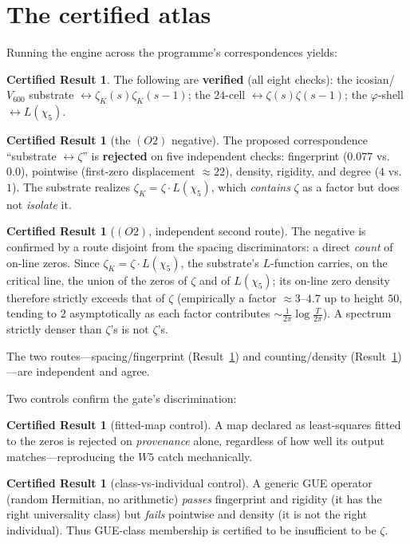 \documentclass[11pt]{article}
\theoremstyle{definition}
\newtheorem{result}[theorem]{Certified Result}
\newcommand{\zetaK}{\zeta_{K}}
\begin{document}
\section{The certified atlas}
Running the engine across the programme's correspondences yields:
\begin{result}\label{res:pos}
The following are \textbf{verified} (all eight checks): the icosian/$V_{600}$
substrate $\leftrightarrow \zetaK(s)\zetaK(s-1)$; the $24$-cell
$\leftrightarrow \zeta(s)\zeta(s-1)$; the $\varphi$-shell $\leftrightarrow L(\chi_5)$.
\end{result}
\begin{result}[the $(O2)$ negative]\label{res:o2}
The proposed correspondence ``substrate $\leftrightarrow \zeta$'' is \textbf{rejected}
on five independent checks: fingerprint ($0.077$ vs.\ $0.0$), pointwise (first-zero
displacement $\approx 22$), density, rigidity, and degree ($4$ vs.\ $1$). The
substrate realizes $\zetaK=\zeta\cdot L(\chi_5)$, which \emph{contains} $\zeta$ as a
factor but does not \emph{isolate} it.
\end{result}
\begin{result}[$(O2)$, independent second route]\label{res:o2b}
The negative is confirmed by a route disjoint from the spacing discriminators: a
direct \emph{count} of on-line zeros. Since $\zetaK=\zeta\cdot L(\chi_5)$, the
substrate's $L$-function carries, on the critical line, the union of the zeros of
$\zeta$ and of $L(\chi_5)$; its on-line zero density therefore strictly exceeds that
of $\zeta$ (empirically a factor $\approx 3$--$4.7$ up to height $50$, tending to $2$
asymptotically as each factor contributes $\sim\tfrac1{2\pi}\log\tfrac{T}{2\pi}$).
A spectrum strictly denser than $\zeta$'s is not $\zeta$'s.
\end{result}
The two routes---spacing/fingerprint (Result~\ref{res:o2}) and counting/density
(Result~\ref{res:o2b})---are independent and agree.

Two controls confirm the gate's discrimination:
\begin{result}[fitted-map control]
A map declared as least-squares fitted to the zeros is rejected on \emph{provenance}
alone, regardless of how well its output matches---reproducing the $W5$ catch
mechanically.
\end{result}
\begin{result}[class-vs-individual control]
A generic GUE operator (random Hermitian, no arithmetic) \emph{passes} fingerprint
and rigidity (it has the right universality class) but \emph{fails} pointwise and
density (it is not the right individual). Thus GUE-class membership is certified to
be insufficient to be $\zeta$.
\end{result}
\end{document}
